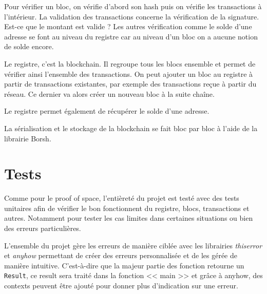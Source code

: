 Pour vérifier un bloc, on vérifie d'abord son hash puis on vérifie les transactions à l'intérieur. La validation des transactions concerne la vérification de la signature. Est-ce que le montant est valide ? Les autres vérification comme le solde d'une adresse se font au niveau du registre car au niveau d'un bloc on a aucune notion de solde encore.

Le registre, c'est la blockchain. Il regroupe tous les blocs ensemble et permet de vérifier ainsi l'ensemble des transactions. On peut ajouter un bloc au registre à partir de transactions existantes, par exemple des transactions reçue à partir du réseau. Ce dernier va alors créer un nouveau bloc à la suite chaîne.

Le registre permet également de récupérer le solde d'une adresse.

La sérialisation et le stockage de la blockchain se fait bloc par bloc à l'aide de la librairie Borsh.

\section{Tests}

Comme pour le proof of space, l'entièreté du projet est testé avec des tests unitaires afin de vérifier le bon fonctionnent du registre, blocs, transactions et autres. Notamment pour tester les cas limites dans certaines situations ou bien des erreurs particulières.

L'ensemble du projet gère les erreurs de manière ciblée avec les librairies \emph{thiserror} et \emph{anyhow} permettant de créer des erreurs personnalisée et de les gérée de manière intuitive. C'est-à-dire que la majeur partie des fonction retourne un \verb|Result|, ce result sera traité dans la fonction << main >> et grâce à anyhow, des contexts peuvent être ajouté pour donner plus d'indication sur une erreur.
